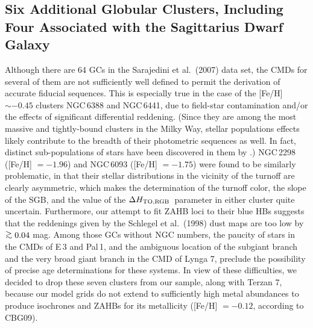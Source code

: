 \documentclass[12pt,preprint]{aastex}
\newcommand\delc{\Delta H_{\rm TO,RGB}}
\newcommand\gta{\mathrel{\hbox{\raise 0.6 ex \hbox{$>$}\kern
                   -1.7 ex\lower .5 ex\hbox{$\sim$}}}}
\begin{document}
\subsection{Six Additional Globular Clusters, Including Four Associated with the
Sagittarius Dwarf Galaxy}
\label{subsec:other}

Although there are 64 GCs in the Sarajedini et al.~(2007) data set, the CMDs
for several of them are not sufficiently well defined to permit the derivation
of accurate fiducial sequences.  This is especially true in the case of the
[Fe/H] $\sim -0.45$ clusters NGC$\,$6388 and NGC$\,$6441, due to field-star
contamination and/or the effects of significant differential reddening.   (Since
they are among the most massive and tightly-bound clusters in the Milky Way,
stellar populations effects likely contribute to the breadth of their
photometric sequences as well.  In fact, distinct sub-populations of stars have
been discovered in them by \citealt{bpm13}.)
NGC$\,$2298 ([Fe/H] $= -1.96$) and NGC$\,$6093
([Fe/H] $= -1.75$) were found to be similarly problematic, in that their stellar
distributions in the vicinity of the turnoff are clearly asymmetric, which makes
the determination of the turnoff color, the slope of the SGB, and the value of
the $\delc$\ parameter in either cluster quite uncertain.  Furthermore, our
attempt to fit ZAHB loci to their blue HBs suggests that the reddenings given by
the Schlegel et al.~(1998) dust maps are too low by $\gta 0.04$ mag.  Among
those GCs without NGC numbers, the paucity of stars in the CMDs of E$\,$3
and Pal$\,$1, and the ambiguous location of the subgiant branch and the very
broad giant branch in the CMD of Lynga 7, preclude the possibility of precise
age determinations for these systems.  In view of these difficulties, we decided
to drop these seven clusters from our sample, along with Terzan 7, because our
model grids do not extend to sufficiently high metal abundances to produce
isochrones and ZAHBs for its metallicity ([Fe/H] $= -0.12$, according to CBG09).
\end{document}
